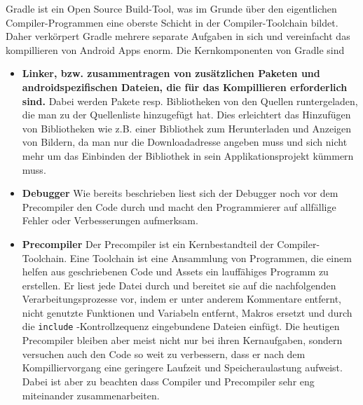 Gradle ist ein Open Source Build-Tool, was im Grunde über den eigentlichen Compiler-Programmen eine oberste Schicht in der Compiler-Toolchain bildet. Daher verkörpert Gradle mehrere separate Aufgaben in sich und vereinfacht das kompillieren von Android Apps enorm.
Die Kernkomponenten von Gradle sind
\begin{itemize}
\item \textbf{Linker, bzw. zusammentragen von zusätzlichen Paketen und androidspezifischen Dateien, die für das Kompillieren erforderlich sind.} Dabei werden Pakete resp. Bibliotheken von den Quellen runtergeladen, 
die man zu der Quellenliste hinzugefügt hat. Dies erleichtert das Hinzufügen von Bibliotheken wie z.B. einer Bibliothek zum Herunterladen und Anzeigen von Bildern, da man nur die Downloadadresse angeben muss
und sich nicht mehr um das Einbinden der Bibliothek in sein Applikationsprojekt kümmern muss.

\item \textbf{Debugger} Wie bereits beschrieben liest sich der Debugger noch vor dem Precompiler den Code durch und macht den Programmierer auf allfällige Fehler oder Verbesserungen aufmerksam.

\item \textbf{Precompiler} Der Precompiler ist ein Kernbestandteil der Compiler-Toolchain. Eine Toolchain ist eine Ansammlung von Programmen, die einem helfen aus geschriebenen Code und Assets ein lauffähiges
Programm zu erstellen. Er liest jede Datei durch und bereitet sie auf die nachfolgenden Verarbeitungsprozesse vor, indem er unter anderem Kommentare entfernt, nicht genutzte Funktionen und Variabeln entfernt, Makros ersetzt und durch die \verb|include| -Kontrollzequenz eingebundene Dateien einfügt. Die heutigen Precompiler bleiben aber meist nicht nur bei ihren Kernaufgaben, sondern versuchen auch den Code so weit zu verbessern,
dass er nach dem Kompilliervorgang eine geringere Laufzeit und Speicheraulastung aufweist. Dabei ist aber zu beachten dass Compiler und Precompiler sehr eng miteinander zusammenarbeiten.


\end{itemize}
